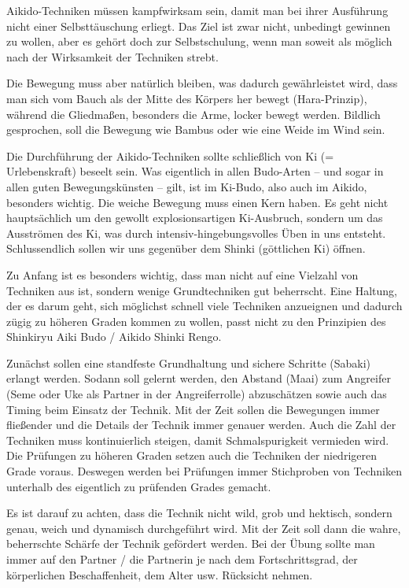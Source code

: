 Aikido-Techniken müssen kampfwirksam sein, damit man bei ihrer Ausführung nicht einer Selbsttäuschung erliegt. Das Ziel ist zwar nicht, unbedingt gewinnen zu wollen, aber es gehört doch zur Selbstschulung, wenn man soweit als möglich nach der Wirksamkeit der Techniken strebt.

Die Bewegung muss aber natürlich bleiben, was dadurch gewährleistet wird, dass man sich vom Bauch als der Mitte des Körpers her bewegt (Hara-Prinzip), während die Gliedmaßen, besonders die Arme, locker bewegt werden. Bildlich gesprochen, soll die Bewegung wie Bambus oder wie eine Weide im Wind sein.

Die Durchführung der Aikido-Techniken sollte schließlich von Ki (= Urlebenskraft) beseelt sein. Was eigentlich in allen Budo-Arten – und sogar in allen guten Bewegungskünsten – gilt, ist im Ki-Budo, also auch im Aikido, besonders wichtig. Die weiche Bewegung muss einen Kern haben. Es geht nicht hauptsächlich um den gewollt explosionsartigen Ki-Ausbruch, sondern um das Ausströmen des Ki, was durch intensiv-hingebungsvolles Üben in uns entsteht. Schlussendlich sollen wir uns gegenüber dem Shinki (göttlichen Ki) öffnen.

Zu Anfang ist es besonders wichtig, dass man nicht auf eine Vielzahl von Techniken aus ist, sondern wenige Grundtechniken gut beherrscht. Eine Haltung, der es darum geht, sich möglichst schnell viele Techniken anzueignen und dadurch zügig zu höheren Graden kommen zu wollen, passt nicht zu den Prinzipien des Shinkiryu Aiki Budo / Aikido Shinki Rengo.

Zunächst sollen eine standfeste Grundhaltung und sichere Schritte (Sabaki) erlangt werden. Sodann soll gelernt werden, den Abstand (Maai) zum Angreifer (Seme oder Uke als Partner in der Angreiferrolle) abzuschätzen sowie auch das Timing beim Einsatz der Technik. Mit der Zeit sollen die Bewegungen immer fließender und die Details der Technik immer genauer werden. Auch die Zahl der Techniken muss kontinuierlich steigen, damit Schmalspurigkeit vermieden wird. Die Prüfungen zu höheren Graden setzen auch die Techniken der niedrigeren Grade voraus. Deswegen werden bei Prüfungen immer Stichproben von Techniken unterhalb des eigentlich zu prüfenden Grades gemacht.

Es ist darauf zu achten, dass die Technik nicht wild, grob und hektisch, sondern genau, weich und dynamisch durchgeführt wird. Mit der Zeit soll dann die wahre, beherrschte Schärfe der Technik gefördert werden. Bei der Übung sollte man immer auf den Partner / die Partnerin je nach dem Fortschrittsgrad, der körperlichen Beschaffenheit, dem Alter usw. Rücksicht nehmen.

